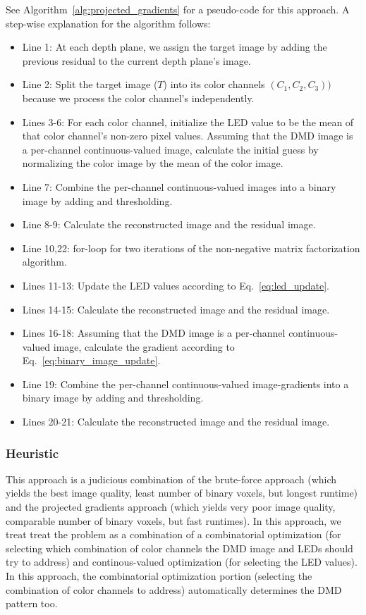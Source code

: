 See Algorithm~\ref{alg:projected_gradients} for a pseudo-code for this approach. A step-wise explanation for the algorithm follows:
\begin{itemize}
    \item Line 1: At each depth plane, we assign the target image by adding the previous residual to the current depth plane's image. 
    \item Line 2: Split the target image ($T$) into its color channels $(C_1, C_2, C_3))$ because we process the color channel's independently.
    \item Lines 3-6: For each color channel, initialize the LED value to be the mean of that color channel's non-zero pixel values. Assuming that the DMD image is a per-channel continuous-valued image, calculate the initial guess by normalizing the color image by the mean of the color image.  
    \item Line 7: Combine the per-channel continuous-valued images into a binary image by adding and thresholding. 
    \item Line 8-9: Calculate the reconstructed image and the residual image.
    \item Line 10,22: for-loop for two iterations of the non-negative matrix factorization algorithm.
    \item Lines 11-13: Update the LED values according to Eq.~\ref{eq:led_update}.
    \item Lines 14-15: Calculate the reconstructed image and the residual image.
    \item Lines 16-18: Assuming that the DMD image is a per-channel continuous-valued image, calculate the gradient according to Eq.~\ref{eq:binary_image_update}.
    \item Line 19: Combine the per-channel continuous-valued image-gradients into a binary image by adding and thresholding.
    \item Lines 20-21: Calculate the reconstructed image and the residual image.
\end{itemize}

\subsubsection{Heuristic}
\label{sec:acd:heuristis}
This approach is a judicious combination of the brute-force approach (which yields the best image quality, least number of binary voxels, but longest runtime) and the projected gradients approach (which yields very poor image quality, comparable number of binary voxels, but fast runtimes). 
In this approach, we treat treat the problem as a combination of a combinatorial optimization (for selecting which combination of color channels the DMD image and LEDs should try to address) and continous-valued optimization (for selecting the LED values). 
In this approach, the combinatorial optimization portion (selecting the combination of color channels to address) automatically determines the DMD pattern too.

